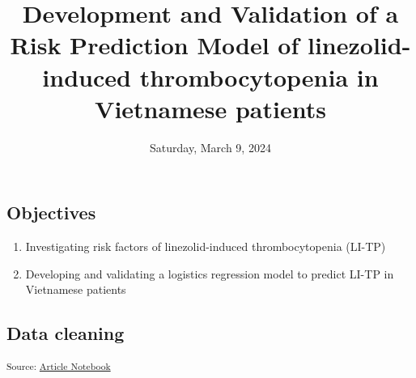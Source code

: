 \documentclass[
  letterpaper,
  DIV=11,
  numbers=noendperiod]{scrartcl}
\title{Development and Validation of a Risk Prediction Model of
linezolid-induced thrombocytopenia in Vietnamese patients}
\author{}
\date{Saturday, March 9, 2024}
\providecommand{\tightlist}{%
  \setlength{\itemsep}{0pt}\setlength{\parskip}{0pt}}\usepackage{longtable,booktabs,array}
\begin{document}
\maketitle

\subsection{Objectives}\label{objectives}

\begin{enumerate}
\def\labelenumi{\arabic{enumi}.}
\tightlist
\item
  Investigating risk factors of linezolid-induced thrombocytopenia
  (LI-TP)
\item
  Developing and validating a logistics regression model to predict
  LI-TP in Vietnamese patients
\end{enumerate}

\subsection{Data cleaning}\label{data-cleaning}

\textsubscript{Source:
\href{https://AnTangQuoc.github.io/LZD-TP-pred-model/index-preview.html}{Article
Notebook}}
\end{document}
